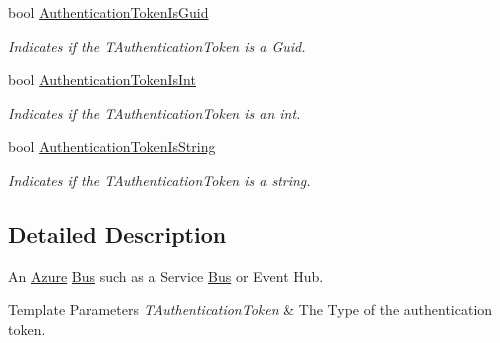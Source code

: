 \begin{DoxyCompactItemize}
bool \hyperlink{classCqrs_1_1Azure_1_1ServiceBus_1_1AzureBus_afc7a8e0c0a739b2a807eacac8f6c5397_afc7a8e0c0a739b2a807eacac8f6c5397}{Authentication\+Token\+Is\+Guid}
\begin{DoxyCompactList}\small\item\em Indicates if the {\itshape T\+Authentication\+Token}  is a Guid. \end{DoxyCompactList}\item 
bool \hyperlink{classCqrs_1_1Azure_1_1ServiceBus_1_1AzureBus_a9ce7d5f1f88f9ccc42093300b7d63a95_a9ce7d5f1f88f9ccc42093300b7d63a95}{Authentication\+Token\+Is\+Int}
\begin{DoxyCompactList}\small\item\em Indicates if the {\itshape T\+Authentication\+Token}  is an int. \end{DoxyCompactList}\item 
bool \hyperlink{classCqrs_1_1Azure_1_1ServiceBus_1_1AzureBus_af23dfd49e2da5aee809b16fc3a43d9d7_af23dfd49e2da5aee809b16fc3a43d9d7}{Authentication\+Token\+Is\+String}
\begin{DoxyCompactList}\small\item\em Indicates if the {\itshape T\+Authentication\+Token}  is a string. \end{DoxyCompactList}\end{DoxyCompactItemize}


\subsection{Detailed Description}
An \hyperlink{namespaceCqrs_1_1Azure}{Azure} \hyperlink{namespaceCqrs_1_1Bus}{Bus} such as a Service \hyperlink{namespaceCqrs_1_1Bus}{Bus} or Event Hub. 


\begin{DoxyTemplParams}{Template Parameters}
{\em T\+Authentication\+Token} & The Type of the authentication token.\\
\hline
\end{DoxyTemplParams}


